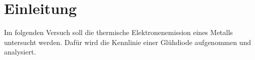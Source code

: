 \section{Einleitung}
\label{sec:einleitung}
Im folgenden Versuch soll die thermische Elektronenemission eines Metalls
untersucht werden. Dafür wird die Kennlinie einer Glühdiode aufgenommen und
analysiert.
